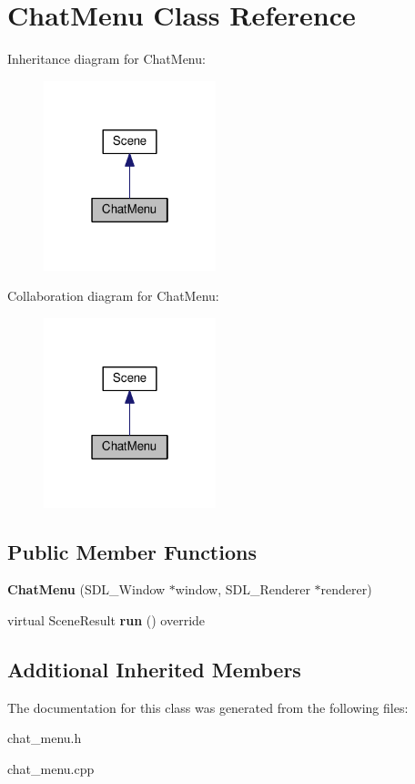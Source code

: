 \hypertarget{classChatMenu}{}\section{Chat\+Menu Class Reference}
\label{classChatMenu}


Inheritance diagram for Chat\+Menu\+:\nopagebreak
\begin{figure}[H]
\begin{center}
\leavevmode
\includegraphics[width=142pt]{classChatMenu__inherit__graph}
\end{center}
\end{figure}


Collaboration diagram for Chat\+Menu\+:\nopagebreak
\begin{figure}[H]
\begin{center}
\leavevmode
\includegraphics[width=142pt]{classChatMenu__coll__graph}
\end{center}
\end{figure}
\subsection*{Public Member Functions}
\begin{DoxyCompactItemize}
\item 
{\bfseries Chat\+Menu} (S\+D\+L\+\_\+\+Window $\ast$window, S\+D\+L\+\_\+\+Renderer $\ast$renderer)\hypertarget{classChatMenu_a2bc09611256858a93511cbe1601cd201}{}\label{classChatMenu_a2bc09611256858a93511cbe1601cd201}

\item 
virtual Scene\+Result {\bfseries run} () override\hypertarget{classChatMenu_ada4cb8bbf52e735622feeb966c3d38a1}{}\label{classChatMenu_ada4cb8bbf52e735622feeb966c3d38a1}

\end{DoxyCompactItemize}
\subsection*{Additional Inherited Members}


The documentation for this class was generated from the following files\+:\begin{DoxyCompactItemize}
\item 
chat\+\_\+menu.\+h\item 
chat\+\_\+menu.\+cpp\end{DoxyCompactItemize}

